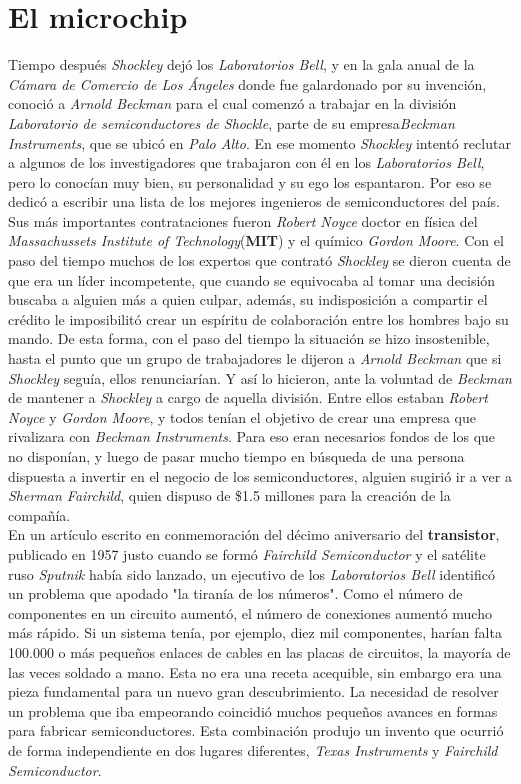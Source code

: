 \chapter{El microchip}\label{chapter:microchip}
Tiempo después \emph{Shockley} dejó los \emph{Laboratorios Bell}, y en la gala anual de la \emph
{Cámara de Comercio de Los Ángeles} donde fue galardonado por su invención, conoció a \emph{Arnold
Beckman} para el cual comenzó a trabajar en la división \emph{Laboratorio de semiconductores de Shockle}, 
parte de su empresa\emph{Beckman Instruments}, que se ubicó en \emph{Palo Alto}. En ese momento \emph{Shockley}
intentó reclutar a algunos de los investigadores que trabajaron con él en los \emph{Laboratorios Bell}, pero lo
conocían muy bien, su personalidad y su ego los espantaron. Por eso se dedicó a escribir una lista de los mejores
ingenieros de semiconductores del país. Sus más importantes contrataciones fueron \emph{Robert Noyce} doctor en 
física del \emph{Massachussets Institute of Technology}(\textbf{MIT}) y el químico \emph{Gordon Moore}. Con el paso 
del tiempo muchos de los expertos que contrató \emph{Shockley} se dieron cuenta de que era un líder incompetente, 
que cuando se equivocaba al tomar una decisión buscaba a alguien más a quien culpar, además, su indisposición a 
compartir el crédito le imposibilitó crear un espíritu de colaboración entre los hombres bajo su mando. De esta forma,
con el paso del tiempo la situación se hizo insostenible, hasta el punto que un grupo de trabajadores le dijeron a 
\emph{Arnold Beckman} que si \emph{Shockley} seguía, ellos renunciarían. Y así lo hicieron, ante la voluntad de \emph
{Beckman} de mantener a \emph{Shockley} a cargo de aquella división. Entre ellos estaban \emph{Robert Noyce} y \emph
{Gordon Moore}, y todos tenían el objetivo de crear una empresa que rivalizara con \emph{Beckman Instruments}. Para eso
eran necesarios fondos de los que no disponían, y luego de pasar mucho tiempo en búsqueda de una persona dispuesta a 
invertir en el negocio de los semiconductores, alguien sugirió ir a ver a \emph{Sherman Fairchild}, quien dispuso de
\$1.5 millones para la creación de la compañía. \\
En un artículo escrito en conmemoración del décimo aniversario del \textbf{transistor}, publicado en 1957 justo
cuando se formó \emph{Fairchild Semiconductor} y el satélite ruso \emph {Sputnik} había sido lanzado, un ejecutivo
de los \emph{Laboratorios Bell} identificó un problema que apodado "la tiranía de los números". Como el número de
componentes en un circuito aumentó, el número de conexiones aumentó mucho más rápido. Si un sistema tenía, por
ejemplo, diez mil componentes, harían falta 100.000 o más pequeños enlaces de cables en las placas de circuitos,
la mayoría de las veces soldado a mano. Esta no era una receta acequible, sin embargo era una pieza fundamental
para un nuevo gran descubrimiento. La necesidad de resolver un problema que iba empeorando coincidió muchos pequeños
avances en formas para fabricar semiconductores. Esta combinación produjo un invento que ocurrió de forma independiente
en dos lugares diferentes, \emph{Texas Instruments} y \emph{Fairchild Semiconductor}.\\
